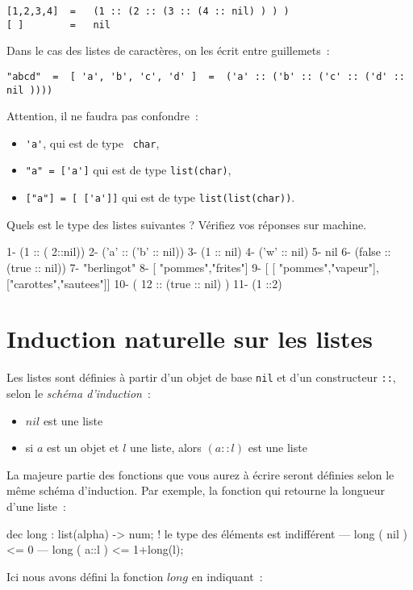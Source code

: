 \begin{verbatim}
[1,2,3,4]  =   (1 :: (2 :: (3 :: (4 :: nil) ) ) ) 
[ ]        =   nil
\end{verbatim}

Dans le cas des listes de caractères, on les écrit entre guillemets~:

\begin{verbatim}
"abcd"  =  [ 'a', 'b', 'c', 'd' ]  =  ('a' :: ('b' :: ('c' :: ('d' :: nil ))))
\end{verbatim}

Attention, il ne faudra pas confondre~:

\begin{itemize}
\item \verb+'a'+, 		qui est de type \texttt{ char},
\item \verb+"a" = ['a']+ 	qui est de type \texttt{list(char)},
\item \verb+["a"] = [ ['a']]+ 	qui est de type \texttt{list(list(char))}.
\end{itemize}

\begin{exercice}
Quels est le type des listes suivantes ? Vérifiez vos réponses sur machine.
\begin{verbatimtab}
1-      (1 :: ( 2::nil))				
2-      ('a' :: ('b' :: nil))
3-      (1 :: nil)
4-      ('w' :: nil)
5-      nil
6-      (false :: (true :: nil))
7-      "berlingot"
8-      [ "pommes","frites"]
9-      [ [ "pommes","vapeur"],["carottes","sautees"]]
10-     ( 12  :: (true :: nil) )
11-     (1 ::2)
\end{verbatimtab}
\end{exercice}

\section{Induction naturelle sur les listes}
\label{fonclistes}
Les listes sont définies à partir d'un objet de base 
\texttt{nil} et d'un constructeur  \verb+::+, selon le
\emph{schéma d'induction}~:

\begin{itemize}
\item $nil$ est une liste
\item si $a$ est un objet et $l$ une liste, alors $(a::l)$ est une liste
\end{itemize}

La majeure partie des fonctions que vous aurez à écrire seront
définies selon le m\^eme schéma d'induction. Par exemple, la fonction
qui retourne la longueur d'une liste~:
\begin{verbatimtab}
dec long : list(alpha) -> num;   ! le type des éléments est indifférent
--- long ( nil )  <= 0
--- long ( a::l ) <= 1+long(l);
\end{verbatimtab}
Ici nous avons défini la fonction $long$ en indiquant~:

